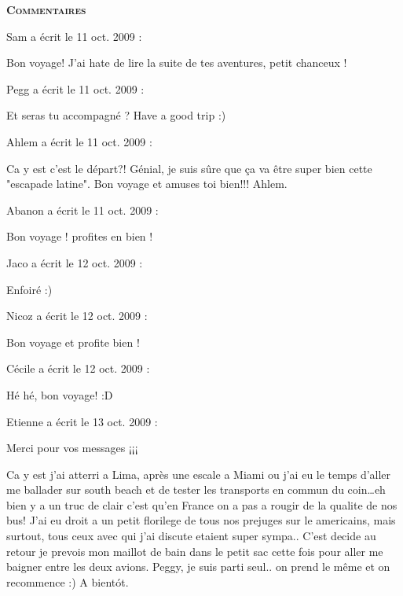 \bigskip
\textbf{\textsc{Commentaires}}

\medskip
Sam a écrit le 11 oct. 2009 :
\begin{displayquote}
Bon voyage! J'ai hate de lire la suite de tes aventures, petit chanceux !
\end{displayquote}

\medskip
Pegg a écrit le 11 oct. 2009 :
\begin{displayquote}
Et seras tu accompagné ? Have a good trip :)
\end{displayquote}

\medskip
Ahlem a écrit le 11 oct. 2009 :
\begin{displayquote}
Ca y est c'est le départ?!
Génial, je suis sûre que ça va être super bien cette "escapade latine".
Bon voyage et amuses toi bien!!!
Ahlem.
\end{displayquote}

\medskip
Abanon a écrit le 11 oct. 2009 :
\begin{displayquote}
Bon voyage ! profites en bien !
\end{displayquote}

\medskip
Jaco a écrit le 12 oct. 2009 :
\begin{displayquote}
Enfoiré :)
\end{displayquote}

\medskip
Nicoz a écrit le 12 oct. 2009 :
\begin{displayquote}
Bon voyage et profite bien !
\end{displayquote}

\medskip
Cécile a écrit le 12 oct. 2009 :
\begin{displayquote}
Hé hé, bon voyage! :D
\end{displayquote}

\medskip
Etienne a écrit le 13 oct. 2009 :
\begin{displayquote}
Merci pour vos messages ¡¡¡

Ca y est j'ai atterri a Lima, après une escale a Miami ou j'ai eu le temps d'aller me ballader sur south beach et de tester les transports en commun du coin\dots eh bien y a un truc de clair c'est qu'en France on a pas a rougir de la qualite de nos bus! J'ai eu droit a un petit florilege de tous nos prejuges sur le americains, mais surtout, tous ceux avec qui j'ai discute etaient super sympa..
C'est decide au retour je prevois mon maillot de bain dans le petit sac cette fois pour aller me baigner entre les deux avions.
Peggy, je suis parti seul.. on prend le même et on recommence :)
A bientót.
\end{displayquote}

